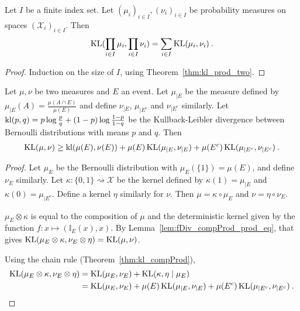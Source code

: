 \begin{theorem}
  \label{thm:kl_pi}
  \leanok
  Let $I$ be a finite index set. Let $(\mu_i)_{i \in I}, (\nu_i)_{i \in I}$ be probability measures on spaces $(\mathcal X_i)_{i \in I}$. Then
  \begin{align*}
  \operatorname{KL}(\prod_{i \in I} \mu_i, \prod_{i \in I} \nu_i) = \sum_{i \in I} \operatorname{KL}(\mu_i, \nu_i)
  \: .
  \end{align*}
\end{theorem}

\begin{proof} \leanok
{}
Induction on the size of $I$, using Theorem~\ref{thm:kl_prod_two}.
\end{proof}

\begin{lemma}
  \label{lem:kl_chain_rule_cond_event}
  Let $\mu, \nu$ be two measures and $E$ an event. Let $\mu_{|E}$ be the measure defined by $\mu_{|E}(A) = \frac{\mu(A \cap E)}{\mu(E)}$ and define $\nu_{|E}$, $\mu_{| E^c}$ and $\nu_{| E^c}$ similarly. Let $\operatorname{kl}(p,q) = p\log\frac{p}{q} + (1-p)\log\frac{1-p}{1-q}$ be the Kullback-Leibler divergence between Bernoulli distributions with means $p$ and $q$. Then
  \begin{align*}
  \operatorname{KL}(\mu, \nu) \ge \operatorname{kl}(\mu(E), \nu(E)) + \mu(E) \operatorname{KL}(\mu_{|E}, \nu_{|E}) + \mu(E^c) \operatorname{KL}(\mu_{|E^c}, \nu_{|E^c}) \: .
  \end{align*}
\end{lemma}

\begin{proof}
Let $\mu_E$ be the Bernoulli distribution with $\mu_E(\{1\}) = \mu(E)$, and define $\nu_E$ similarly.
Let $\kappa : \{0,1\} \rightsquigarrow \mathcal X$ be the kernel defined by $\kappa(1) = \mu_{|E}$ and $\kappa(0) = \mu_{|E^c}$. Define a kernel $\eta$ similarly for $\nu$.
Then $\mu = \kappa \circ \mu_E$ and $\nu = \eta \circ \nu_E$.

$\mu_E \otimes \kappa$ is equal to the composition of $\mu$ and the deterministic kernel given by the function $f : x \mapsto (\mathbb{I}_E(x), x)$. By Lemma~\ref{lem:fDiv_compProd_prod_eq}, that gives $\operatorname{KL}(\mu_E \otimes \kappa, \nu_E \otimes \eta) = \operatorname{KL}(\mu, \nu)$.

Using the chain rule (Theorem~\ref{thm:kl_compProd}),
\begin{align*}
\operatorname{KL}(\mu_E \otimes \kappa, \nu_E \otimes \eta)
&= \operatorname{KL}(\mu_E, \nu_E) + \operatorname{KL}(\kappa, \eta \mid \mu_E)
\\
&= \operatorname{KL}(\mu_E, \nu_E) + \mu(E) \operatorname{KL}(\mu_{|E}, \nu_{|E}) + \mu(E^c) \operatorname{KL}(\mu_{|E^c}, \nu_{|E^c})
\: .
\end{align*}

\end{proof}

